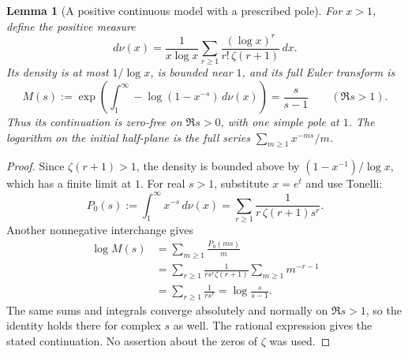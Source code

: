 \documentclass[11pt]{article}
\newtheorem{lemma}[theorem]{Lemma}
\theoremstyle{definition}
\begin{document}
\begin{lemma}[A positive continuous model with a prescribed pole]
\label{lem:continuous-prime-model}
For $x>1$, define the positive measure
\[
 d\nu(x)=
 \frac{1}{x\log x}
 \sum_{r\ge1}\frac{(\log x)^r}{r!\,\zeta(r+1)}\,dx.
\]
Its density is at most $1/\log x$, is bounded near $1$, and its
full Euler transform is
\begin{equation}
 M(s):=\exp\left(\int_1^\infty
                     -\log(1-x^{-s})\,d\nu(x)\right)
       =\frac{s}{s-1}\qquad(\Re s>1).
 \label{eq:continuous-prime-model}
\end{equation}
Thus its continuation is zero-free on $\Re s>0$, with one simple
pole at $1$. The logarithm on the initial half-plane is the full
series $\sum_{m\ge1}x^{-ms}/m$.
\end{lemma}

\begin{proof}
Since $\zeta(r+1)>1$, the density is bounded above by
$(1-x^{-1})/\log x$, which has a finite limit at $1$.
For real $s>1$, substitute $x=e^t$ and use Tonelli:
\[
 P_0(s):=\int_1^\infty x^{-s}\,d\nu(x)
       =\sum_{r\ge1}\frac{1}{r\,\zeta(r+1)s^r}.
\]
Another nonnegative interchange gives
\begin{align*}
 \log M(s)&=\sum_{m\ge1}\frac{P_0(ms)}m\\
 &=\sum_{r\ge1}\frac{1}{r s^r\zeta(r+1)}
                      \sum_{m\ge1}m^{-r-1}\\
 &=\sum_{r\ge1}\frac{1}{r s^r}
 =\log\frac{s}{s-1}.
\end{align*}
The same sums and integrals converge absolutely and normally on
$\Re s>1$, so the identity holds there for complex $s$ as well.
The rational expression gives the stated continuation.
No assertion about the zeros of $\zeta$ was used.
\end{proof}
\end{document}
